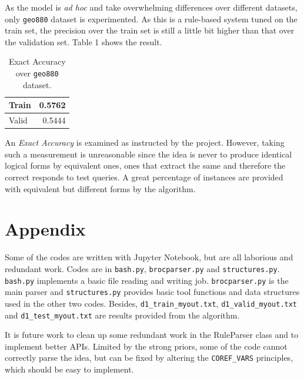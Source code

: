 \documentclass[11pt,a4paper]{article}
\begin{document}
As the model is \textit{ad hoc} and take overwhelming differences over different datasets, only \texttt{geo880} dataset is experimented. As this is a rule-based system tuned on the train set, the precision over the train set is still a little bit higher than that over the validation set. Table 1 shows the result.

\begin{table}
\label{tab1}
\centering
\begin{tabular}{|l|r|}
\hline
Train & 0.5762 \\
\hline
Valid & 0.5444 \\
\hline
\end{tabular}
\caption{Exact Accuracy over \texttt{geo880} dataset.}
\end{table}

An \textit{Exact Accuracy} is examined as instructed by the project. However, taking such a measurement is unreasonable since the idea is never to produce identical logical forms by equivalent ones, ones that extract the same and therefore the correct responds to test queries. A great percentage of instances are provided with equivalent but different forms by the algorithm.

\section*{Appendix}

Some of the codes are written with Jupyter Notebook, but are all laborious and redundant work. Codes are in \texttt{bash.py}, \texttt{brocparser.py} and \texttt{structures.py}. \texttt{bash.py} implements a basic file reading and writing job. \texttt{brocparser.py} is the main parser and \texttt{structures.py} provides basic tool functions and data structures used in the other two codes. Besides, \texttt{d1\_train\_myout.txt}, \texttt{d1\_valid\_myout.txt} and \texttt{d1\_test\_myout.txt} are results provided from the algorithm.

It is future work to clean up some redundant work in the RuleParser class and to implement better APIs. Limited by the strong priors, some of the code cannot correctly parse the idea, but can be fixed by altering the \texttt{COREF\_VARS} principles, which should be easy to implement.
\end{document}
